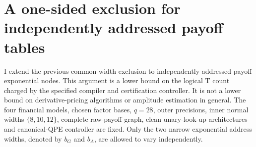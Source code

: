 \section{A one-sided exclusion for independently addressed payoff tables}
\label{sec:raw-asymmetric-high-width-exclusion}

I extend the previous common-width exclusion to independently addressed
payoff exponential nodes. This argument is a lower bound on the logical
T count charged by the specified compiler and certification controller.
It is not a lower bound on derivative-pricing algorithms or amplitude
estimation in general. The four financial models, chosen factor bases,
$q=28$, outer precisions, inner normal widths $\{8,10,12\}$, complete
raw-payoff graph, clean unary-look-up architectures and canonical-QPE
controller are fixed. Only the two narrow exponential address widths,
denoted by $b_G$ and $b_A$, are allowed to vary independently.

